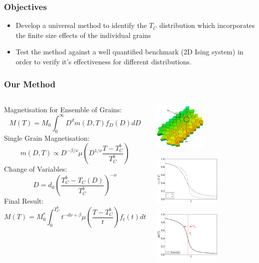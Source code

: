 \documentclass{beamer}
\begin{document}
\begin{frame}
	\frametitle{Objectives}
	\begin{itemize}
		\item{Develop a universal method to identify the $T_C$ distribution which incorporates the finite size effects of the individual grains\newline}
		\item{Test the method against a well quantified benchmark (2D Ising system) in order to verify it's effectiveness for different distributions.\newline}
	\end{itemize}
\end{frame}

\begin{frame}
	\frametitle{Our Method}
	\begin{columns}
	\column{8cm}
	\small{
	\newline
	Magnetisation for Ensemble of Grains:
	$$
	M(T) = M_0\int_0^\infty D^{d} m(D,T) f_D(D) dD
	$$
	Single Grain Magnetisation:
	$$
	m(D,T) \propto D^{-\beta/\nu} \mu \left(D^{1/\nu}\frac{T-T_C^b}{T_C^b}\right)
	$$
	Change of Variables:
	$$
	D = d_0\left(\frac{T_C^b - T_C(D)}{T_C^b}\right)^{-\nu} 
	$$
	Final Result:
	$$
	M(T) = M_0^*\int_0^{T_C^b} t^{-d\nu +\beta} \mu\left(\frac{T-T_C^b}{t}\right) f_t(t) dt
	$$}
	\column{4cm}
	\begin{center}
	\includegraphics[width=2.5cm]{Images/grains2}	
	
	\includegraphics[width=3.25cm]{Images/Ds_noinset}
	
	\includegraphics[width=3.25cm]{Images/Aggregate}
	\end{center}
	\end{columns}
\end{frame}
\end{document}
